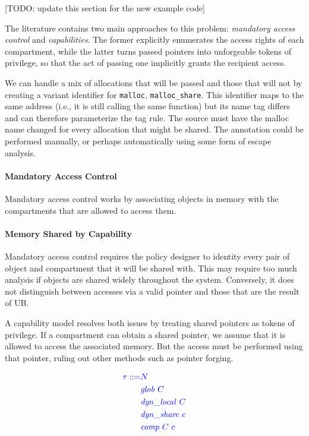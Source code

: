 \documentclass{llncs}
\begin{document}
[TODO: update this section for the new example code]

The literature contains two main approaches to this problem:
{\em mandatory access control} and {\em capabilities}. The former explicitly
enumerates the access rights of each compartment, while the latter turns passed
pointers into unforgeable tokens of privilege, so that the act of passing one
implicitly grants the recipient access.

We can handle a mix of allocations that will be passed and those that will not
by creating a variant identifier for {\tt malloc}, {\tt malloc\_share}. This
identifier maps to the same address (i.e., it is still calling the same function)
but its name tag differs and can therefore parameterize the tag rule. The source
must have the malloc name changed for every allocation that might be shared.
The annotation could be performed manually, or perhaps automatically using some form
of escape analysis.

\paragraph{Mandatory Access Control}

Mandatory access control works by associating objects in memory with the compartments that
are allowed to access them. 

\paragraph{Memory Shared by Capability}

Mandatory access control requires the policy designer to identity every pair of object
and compartment that it will be shared with. This may require too much analysis if
objects are shared widely throughout the system. Conversely, it does not
distinguish between accesses via a valid pointer and those that are the result of
UB.

A capability model resolves both issues by treating shared pointers as tokens of privilege.
If a compartment can obtain a shared pointer, we assume that it is allowed to access the associated
memory. But the access must be performed using that pointer, ruling out other methods such as pointer
forging.

\[\color{blue}
\begin{split}
  \tau ::= & {\color{blue} N} \\
  & \mathit{glob} ~ C \\
  & \mathit{dyn\_local} ~ C \\
  & \mathit{dyn\_share} ~ c \\
  & \mathit{comp} ~ C ~ c \\
\end{split}\]
\end{document}
